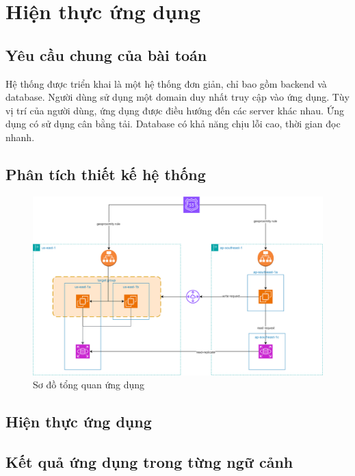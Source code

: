 \section{Hiện thực ứng dụng}
\label{results}

\subsection{Yêu cầu chung của bài toán}

Hệ thống được triển khai là một hệ thống đơn giản, chỉ bao gồm backend và database. Người dùng sử dụng một domain duy nhất truy cập vào ứng dụng. Tùy vị trí của người dùng, ứng dụng được điều hướng đến các server khác nhau. Ứng dụng có sử dụng cân bằng tải. Database có khả năng chịu lỗi cao, thời gian đọc nhanh.

\subsection{Phân tích thiết kế hệ thống}

\begin{figure}
    \centering
    \includegraphics[scale=0.3]{../figures/section4/overall-diagram.png}
    \caption{Sơ đồ tổng quan ứng dụng}
    \label{fig:sec4-overall-diagram}
\end{figure}

\subsection{Hiện thực ứng dụng}

\subsection{Kết quả ứng dụng trong từng ngữ cảnh}